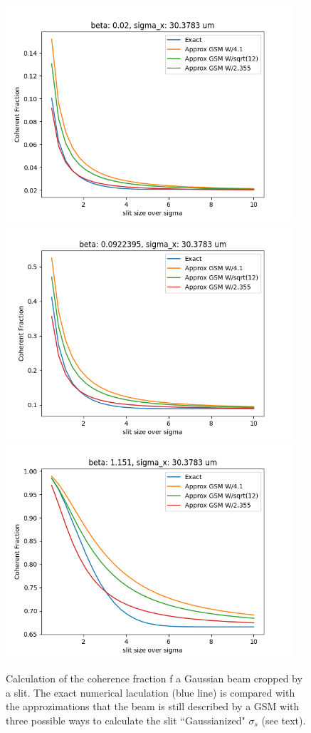 \documentclass{iucr}              %
\begin{document}
\begin{figure}
    \centering
    \includegraphics[width=0.95\textwidth]{figures/Figure_1a.png}
    \includegraphics[width=0.95\textwidth]{figures/Figure_1b.png}
    \includegraphics[width=0.95\textwidth]{figures/Figure_1c.png}
    \caption{Calculation of the coherence fraction f a Gaussian beam cropped by a slit. The exact numerical laculation (blue line) is compared with the approzimations that the beam is still described by a GSM with three possible ways to calculate the slit ``Gaussianized" $\sigma_s$ (see text). }
    \label{fig:GSMslit}
\end{figure}
\end{document}
